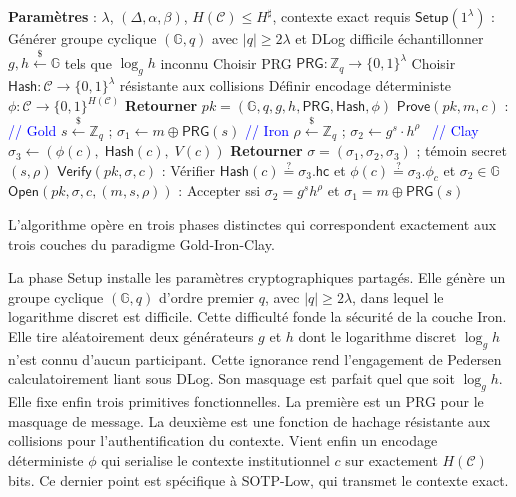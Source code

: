 \begin{sloppypar}
\begin{algorithm}[H]
\caption{SOTP-Low}
\label{alg:sotp_low}
\begin{algorithmic}[1]
\State \textbf{Param\`etres} : $\lambda$, $(\Delta, \alpha, \beta)$, $H(\mathcal{C}) \leq H^\sharp$, contexte exact requis
\State \textbf{$\mathsf{Setup}(1^\lambda)$} :
\State \quad G\'en\'erer groupe cyclique $(\mathbb{G}, q)$ avec $|q| \geq 2\lambda$ et DLog difficile
\State \quad \'echantillonner $g, h \xleftarrow{\$} \mathbb{G}$ tels que $\log_g h$ inconnu
\State \quad Choisir PRG $\mathsf{PRG}: \mathbb{Z}_q \to \{0,1\}^\lambda$
\State \quad Choisir $\mathsf{Hash}: \mathcal{C} \to \{0,1\}^\lambda$ r\'esistante aux collisions
\State \quad D\'efinir encodage d\'eterministe $\phi: \mathcal{C} \to \{0,1\}^{H(\mathcal{C})}$
\State \quad \textbf{Retourner} $pk = (\mathbb{G}, q, g, h, \mathsf{PRG}, \mathsf{Hash}, \phi)$
\State \textbf{$\mathsf{Prove}(pk, m, c)$} :
\State \quad \textcolor{blue}{// Gold}
\State \quad $s \xleftarrow{\$} \mathbb{Z}_q$ ;\; $\sigma_1 \leftarrow m \oplus \mathsf{PRG}(s)$
\State \quad \textcolor{blue}{// Iron}
\State \quad $\rho \xleftarrow{\$} \mathbb{Z}_q$ ;\; $\sigma_2 \leftarrow g^{s} \cdot h^\rho$~\cite{Pedersen91}
\State \quad \textcolor{blue}{// Clay}
\State \quad $\sigma_3 \leftarrow (\phi(c),\; \mathsf{Hash}(c),\; V(c))$
\State \quad \textbf{Retourner} $\sigma = (\sigma_1, \sigma_2, \sigma_3)$ ;\; t\'emoin secret $(s, \rho)$
\State \textbf{$\mathsf{Verify}(pk, \sigma, c)$} :
\State \quad V\'erifier $\mathsf{Hash}(c) \stackrel{?}{=} \sigma_3.\mathsf{hc}$ et
         $\phi(c) \stackrel{?}{=} \sigma_3.\phi_c$ et $\sigma_2 \in \mathbb{G}$
\State \textbf{$\mathsf{Open}(pk, \sigma, c, (m, s, \rho))$} :
\State \quad Accepter ssi $\sigma_2 = g^{s} h^{\rho}$ et $\sigma_1 = m \oplus \mathsf{PRG}(s)$
\end{algorithmic}
\end{algorithm}

L'algorithme op\`ere en trois phases distinctes qui correspondent exactement
aux trois couches du paradigme Gold-Iron-Clay.

La phase \textsf{Setup} installe les param\`etres cryptographiques partag\'es.
Elle g\'en\`ere un groupe cyclique $(\mathbb{G}, q)$ d'ordre premier $q$, avec
$|q| \geq 2\lambda$, dans lequel le logarithme discret est difficile. Cette difficult\'e fonde
la s\'ecurit\'e de la couche Iron. Elle tire al\'eatoirement deux g\'en\'erateurs
$g$ et $h$ dont le logarithme discret $\log_g h$ n'est connu d'aucun
participant. Cette ignorance rend l'engagement de Pedersen calculatoirement
liant sous DLog. Son masquage est parfait quel que soit $\log_g h$. Elle fixe enfin trois primitives fonctionnelles. La premi\`ere est
un PRG pour le masquage de message. La deuxi\`eme est une fonction de hachage r\'esistante
aux collisions pour l'authentification du contexte. Vient enfin un encodage
d\'eterministe $\phi$ qui serialise le contexte institutionnel $c$ sur
exactement $H(\mathcal{C})$ bits. Ce dernier point est sp\'ecifique \`a SOTP-Low, qui
transmet le contexte exact.


\end{sloppypar}
